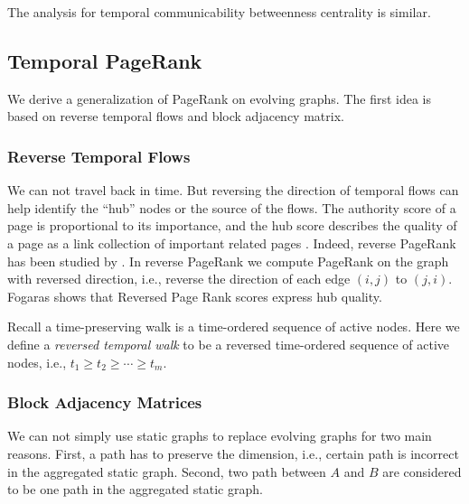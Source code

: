 \documentclass[12pt]{article}
\theoremstyle{definition}
\begin{document}
The analysis for temporal communicability betweenness centrality is similar.

\subsection{Temporal PageRank}

We derive a generalization of PageRank on evolving graphs.
The first idea is based on reverse temporal flows and block adjacency matrix.

\subsubsection{Reverse Temporal Flows}

We can not travel back in time. But reversing the direction of temporal flows can help
identify the ``hub'' nodes or the source of the flows. The authority score of a page is
proportional to its importance, and the hub score describes the quality of a page as a link collection of important related pages \cite{kleinberg99}.
Indeed, reverse PageRank has
been studied by \cite{bar08, fogaras03, gleich15}. In reverse PageRank we compute PageRank on the graph with reversed direction, i.e., reverse the direction of each edge $(i,j)$ to $(j, i)$.
Fogaras \cite{fogaras03} shows that Reversed Page Rank scores express hub quality.


Recall a time-preserving walk is a time-ordered sequence of active nodes. Here we define a \emph{reversed temporal walk} to be a reversed time-ordered sequence of active nodes, i.e.,
$t_1 \ge t_2 \ge \cdots \ge t_m$.


\subsubsection{Block Adjacency Matrices}
\label{sec:centr-block-adjac}

We can not simply use static graphs to replace evolving graphs for two main reasons.
First, a path has to preserve the dimension, i.e., certain path is incorrect in the aggregated static graph.
Second, two path between $A$ and $B$ are considered to be one path in the aggregated static graph.
\end{document}
